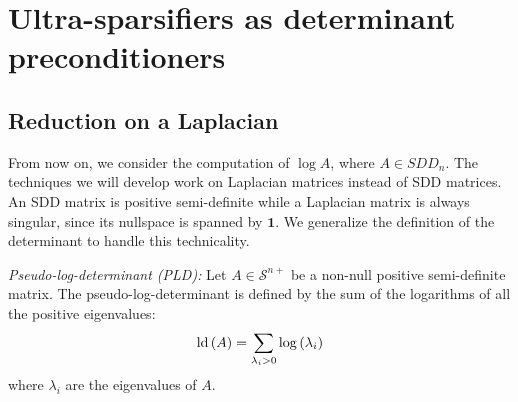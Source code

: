 
\section{Ultra-sparsifiers as determinant preconditioners}


\subsection{Reduction on a Laplacian}

\label{sec:Making-the-problem}

From now on, we consider the computation of $\log A$, where $A\in SDD_{n}$.
The techniques we will develop work on Laplacian matrices instead
of SDD matrices. An SDD matrix is positive semi-definite while a Laplacian
matrix is always singular, since its nullspace is spanned by $\mathbf{1}$.
We generalize the definition of the determinant to handle this technicality. 
\begin{definition}
\emph{Pseudo-log-determinant (PLD):} Let $A\in\mathcal{S}^{n+}$ be
a non-null positive semi-definite matrix. The pseudo-log-determinant
is defined by the sum of the logarithms of all the positive eigenvalues:
\[
\text{\textnormal{ld}}\left(A\right)=\sum_{\lambda_{i}>0}\log\left(\lambda_{i}\right)
\]
where $\lambda_{i}$ are the eigenvalues of $A$. 
\end{definition}

